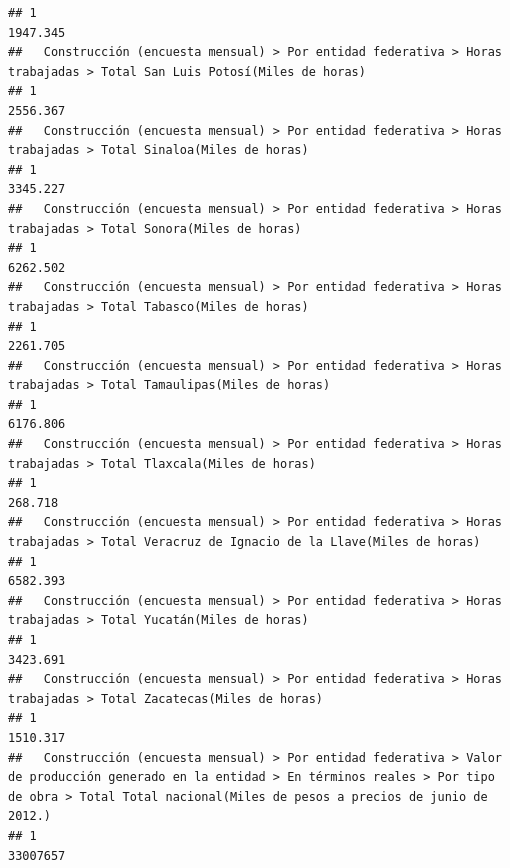 \documentclass[
]{article}
\begin{document}
\begin{verbatim}
## 1                                                                                                          1947.345
##   Construcción (encuesta mensual) > Por entidad federativa > Horas trabajadas > Total San Luis Potosí(Miles de horas) 
## 1                                                                                                             2556.367
##   Construcción (encuesta mensual) > Por entidad federativa > Horas trabajadas > Total Sinaloa(Miles de horas) 
## 1                                                                                                     3345.227
##   Construcción (encuesta mensual) > Por entidad federativa > Horas trabajadas > Total Sonora(Miles de horas) 
## 1                                                                                                    6262.502
##   Construcción (encuesta mensual) > Por entidad federativa > Horas trabajadas > Total Tabasco(Miles de horas) 
## 1                                                                                                     2261.705
##   Construcción (encuesta mensual) > Por entidad federativa > Horas trabajadas > Total Tamaulipas(Miles de horas) 
## 1                                                                                                        6176.806
##   Construcción (encuesta mensual) > Por entidad federativa > Horas trabajadas > Total Tlaxcala(Miles de horas) 
## 1                                                                                                       268.718
##   Construcción (encuesta mensual) > Por entidad federativa > Horas trabajadas > Total Veracruz de Ignacio de la Llave(Miles de horas) 
## 1                                                                                                                             6582.393
##   Construcción (encuesta mensual) > Por entidad federativa > Horas trabajadas > Total Yucatán(Miles de horas) 
## 1                                                                                                     3423.691
##   Construcción (encuesta mensual) > Por entidad federativa > Horas trabajadas > Total Zacatecas(Miles de horas) 
## 1                                                                                                       1510.317
##   Construcción (encuesta mensual) > Por entidad federativa > Valor de producción generado en la entidad > En términos reales > Por tipo de obra > Total Total nacional(Miles de pesos a precios de junio de 2012.) 
## 1                                                                                                                                                                                                          33007657

\end{verbatim}
\end{document}

